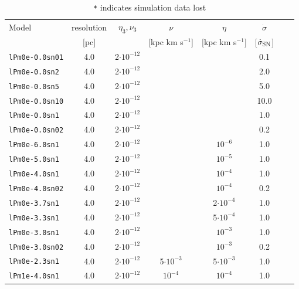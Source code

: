\documentclass[preprint2]{aastex63}
\begin{document}
\begin{table}
\caption{\texttt{*} indicates simulation data lost}
\begin{tabular}{lccccccc}
Model            & resolution & $\eta_3,\nu_3$      & $\nu$            & $\eta$          & $\dot\sigma$  \\
                 & [pc]       &                     & [kpc km s$^{-1}$]&[kpc km s$^{-1}$]&[$\dot\sigma_{\rm SN}$] \\
\texttt{lPm0e-0.0sn01}  & 4.0 & 2$\cdot10^{-12}$    &                  &                 & 0.1  \\
\texttt{lPm0e-0.0sn2}   & 4.0 & 2$\cdot10^{-12}$    &                  &                 & 2.0  \\
\texttt{lPm0e-0.0sn5}   & 4.0 & 2$\cdot10^{-12}$    &                  &                 & 5.0  \\
\texttt{lPm0e-0.0sn10}  & 4.0 & 2$\cdot10^{-12}$    &                  &                 & 10.0 \\
\texttt{lPm0e-0.0sn1}   & 4.0 & 2$\cdot10^{-12}$    &                  &                 &  1.0 \\
\texttt{lPm0e-0.0sn02}  & 4.0 & 2$\cdot10^{-12}$    &                  &                 &  0.2 \\
\texttt{lPm0e-6.0sn1}   & 4.0 & 2$\cdot10^{-12}$    &                  & $     10^{-6}$  &  1.0 \\
\texttt{lPm0e-5.0sn1}   & 4.0 & 2$\cdot10^{-12}$    &                  & $     10^{-5}$  &  1.0 \\
\texttt{lPm0e-4.0sn1}   & 4.0 & 2$\cdot10^{-12}$    &                  & $     10^{-4}$  &  1.0 \\
\texttt{lPm0e-4.0sn02}  & 4.0 & 2$\cdot10^{-12}$    &                  & $     10^{-4}$  &  0.2 \\
\texttt{lPm0e-3.7sn1}   & 4.0 & 2$\cdot10^{-12}$    &                  & 2$\cdot10^{-4}$ &  1.0 \\
\texttt{lPm0e-3.3sn1}   & 4.0 & 2$\cdot10^{-12}$    &                  & 5$\cdot10^{-4}$ &  1.0 \\
\texttt{lPm0e-3.0sn1}   & 4.0 & 2$\cdot10^{-12}$    &                  & $     10^{-3}$  &  1.0 \\
\texttt{lPm0e-3.0sn02}  & 4.0 & 2$\cdot10^{-12}$    &                  & $     10^{-3}$  &  0.2 \\
\texttt{lPm0e-2.3sn1}   & 4.0 & 2$\cdot10^{-12}$    & 5$\cdot10^{-3}$  & 5$\cdot10^{-3}$ &  1.0 \\
\texttt{lPm1e-4.0sn1}   & 4.0 & 2$\cdot10^{-12}$    &       $10^{-4}$  &       $10^{-4}$ &  1.0 \\    

\end{tabular}
\end{table}
\end{document}
